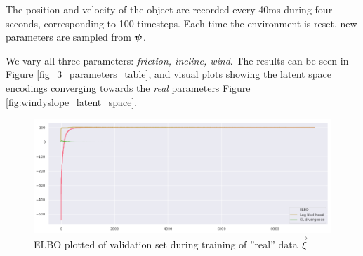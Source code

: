 The position and velocity of the object are recorded every 40ms during four seconds, corresponding to 100 timesteps. Each time the environment is reset, new parameters are sampled from $\boldsymbol{\psi}$.


We vary all three parameters: \textit{friction, incline, wind}. The results can be seen in Figure \ref{fig_3_parameters_table}, and visual plots showing the latent space encodings converging towards the \emph{real} parameters Figure \ref{fig:windyslope_latent_space}.




\begin{figure}
    \centering
    \includegraphics[width=\textwidth]{img/windyslope/windyslope_elbo.png}
    \caption{ELBO plotted of validation set during training of ''real'' data $\vec{\xi}$}
    \label{fig:my_label}
\end{figure}


